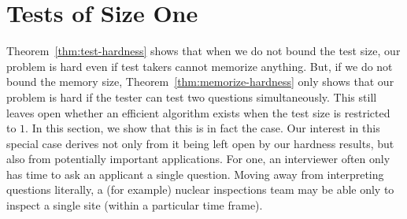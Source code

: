 \documentclass{article}
\begin{document}




\section{Tests of Size One}

Theorem~\ref{thm:test-hardness} shows that when we do not bound the test
size, our problem is hard even if test takers cannot memorize anything.
But, if we do not bound the memory size,
Theorem~\ref{thm:memorize-hardness} only shows that our problem is hard if
the tester can test two questions simultaneously.  
This still leaves open whether an efficient algorithm exists when the test
size is restricted to $1$.  In this section, we show that this is in fact
the case.  Our interest in this special case derives not only from it being
left open by our hardness results, but also from potentially important
applications.  For one, an interviewer often only has time to ask an
applicant a single question.  Moving away from interpreting questions
literally, a (for example) nuclear inspections team may be able only to
inspect a single site (within a particular time frame).
\end{document}
